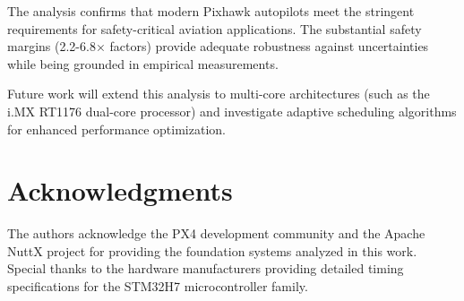 \documentclass[11pt,a4paper]{article}
\theoremstyle{definition}
\theoremstyle{remark}
\begin{document}
The analysis confirms that modern Pixhawk autopilots meet the stringent requirements for safety-critical aviation applications. The substantial safety margins (2.2-6.8× factors) provide adequate robustness against uncertainties while being grounded in empirical measurements.

Future work will extend this analysis to multi-core architectures (such as the i.MX RT1176 dual-core processor) and investigate adaptive scheduling algorithms for enhanced performance optimization.

\section*{Acknowledgments}

The authors acknowledge the PX4 development community and the Apache NuttX project for providing the foundation systems analyzed in this work. Special thanks to the hardware manufacturers providing detailed timing specifications for the STM32H7 microcontroller family.
\end{document}
